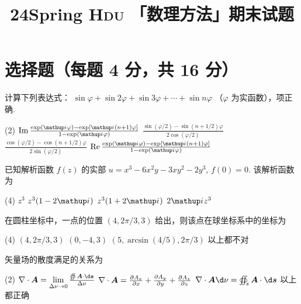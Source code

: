 \documentclass[quiet]{ctexart}
\title{\sffamily\bfseries 24Spring \textsc{Hdu} 「数理方法」期末试题}
\author{} \date{}
\begin{document}
\maketitle

\section{选择题（每题 4 分，共 16 分）}

\begin{problem}
  计算下列表达式：
  $\sin\varphi + \sin2\varphi + \sin3\varphi + \cdots + \sin n\varphi$
  （$\varphi$ 为实函数），\result*项正确.
  \begin{tasks}(2)
    \task $\Im\frac{\exp(\iu\varphi) - \exp[\iu(n + 1)\varphi]}{1 - \exp(\iu\varphi)}$
    \task $\frac{\sin(\varphi/2) - \sin(n + 1/2)\varphi}{2\cos(\varphi/2)}$
    \task $\frac{\cos(\varphi/2) - \cos(n + 1/2)\varphi}{2\sin(\varphi/2)}$
    \task $\Re\frac{\exp(\iu\varphi) - \exp[\iu(n + 1)\varphi]}{1 - \exp(\iu\varphi)}$
  \end{tasks}
\end{problem}
\begin{solution}

\end{solution}

\begin{problem}
  已知解析函数 $f(z)$ 的实部 $u = x^3 - 6x^2y - 3xy^2 -2y^3$, $f(0) = 0$. 该解析函数为
  \begin{tasks}(4)
    \task $z^3$
    \task $z^3(1 - 2\iu)$
    \task $z^3(1 + 2\iu)$
    \task $2\iu z^3$
  \end{tasks}
\end{problem}
\begin{solution}

\end{solution}

\begin{problem}
  在圆柱坐标中，一点的位置 $(4,2\pi/3,3)$ 给出，则该点在球坐标系中的坐标为
  \begin{tasks}(4)
    \task $(4,2\pi/3,3)$
    \task $(0,-4,3)$
    \task $(5,\arcsin(4/5),2\pi/3)$
    \task 以上都不对
  \end{tasks}
\end{problem}
\begin{solution}

\end{solution}

\begin{problem}
  矢量场的散度满足的关系为
  \begin{tasks}(2)
    \task $\nabla \cdot \bm A = \lim\limits_{\Delta \nu \to 0} 
           \frac{\oiint \bm A \cdot \d\bm s}{\Delta \nu}$
    \task $\nabla \cdot \bm A = \pdv{A_x}x + \pdv{A_y}y + \pdv{A_z}z$
    \task $\nabla \cdot \bm A \d \nu = \oiint_s \bm A \cdot \d \bm s$
    \task 以上都正确
  \end{tasks}
\end{problem}
\begin{solution}
  
\end{solution}
\end{document}
